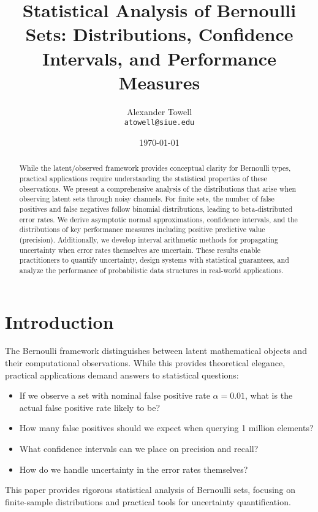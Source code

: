 \documentclass[11pt,final,hidelinks]{article}
\title{Statistical Analysis of Bernoulli Sets: Distributions, Confidence Intervals, and Performance Measures}
\author{
    Alexander Towell\\
    \texttt{atowell@siue.edu}
}
\date{\today}
\newcommand{\fprate}{\alpha}
\begin{document}
\maketitle

\begin{abstract}
While the latent/observed framework provides conceptual clarity for Bernoulli types, practical applications require understanding the statistical properties of these observations. We present a comprehensive analysis of the distributions that arise when observing latent sets through noisy channels. For finite sets, the number of false positives and false negatives follow binomial distributions, leading to beta-distributed error rates. We derive asymptotic normal approximations, confidence intervals, and the distributions of key performance measures including positive predictive value (precision). Additionally, we develop interval arithmetic methods for propagating uncertainty when error rates themselves are uncertain. These results enable practitioners to quantify uncertainty, design systems with statistical guarantees, and analyze the performance of probabilistic data structures in real-world applications.
\end{abstract}

\section{Introduction}

The Bernoulli framework distinguishes between latent mathematical objects and their computational observations. While this provides theoretical elegance, practical applications demand answers to statistical questions:
\begin{itemize}
    \item If we observe a set with nominal false positive rate $\fprate = 0.01$, what is the actual false positive rate likely to be?
    \item How many false positives should we expect when querying 1 million elements?
    \item What confidence intervals can we place on precision and recall?
    \item How do we handle uncertainty in the error rates themselves?
\end{itemize}

This paper provides rigorous statistical analysis of Bernoulli sets, focusing on finite-sample distributions and practical tools for uncertainty quantification.
\end{document}
